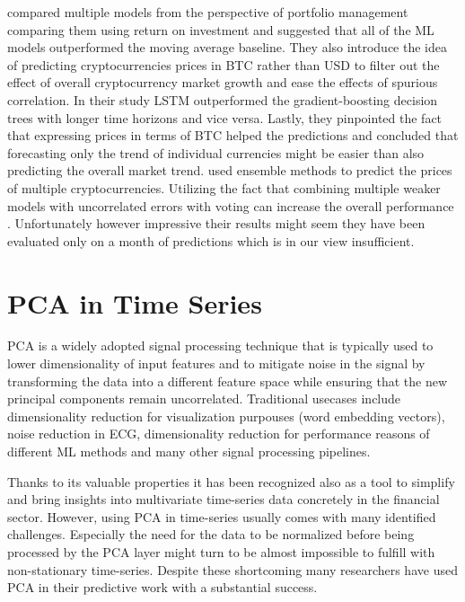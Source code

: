 \cite{Alessandretti2018} compared multiple models from the perspective
of portfolio management comparing them using return on investment and
suggested that all of the \ac{ML} models outperformed the moving average baseline.
They also introduce the idea of predicting cryptocurrencies prices in \ac{BTC} 
rather than USD
to filter out the effect of overall cryptocurrency market growth and ease 
the effects of spurious correlation. In their study \ac{LSTM} outperformed 
the gradient-boosting decision trees with longer time horizons and vice versa.
Lastly, they pinpointed the fact that expressing prices in terms of \ac{BTC}
helped the predictions and concluded that forecasting only the trend of individual 
currencies might be easier than also predicting the overall market trend.
\cite{Chowdhury2020} used ensemble methods to predict the prices of multiple 
cryptocurrencies. Utilizing the fact that combining multiple weaker models
with uncorrelated errors with voting can increase the overall 
performance \cite[see Chapter 14.2]{bishop2006pattern}. 
Unfortunately however impressive their results might seem
they have been evaluated only on a month of predictions which is in our view insufficient.





\section{PCA in Time Series}
\label{sec:pca}

\ac{PCA} is a widely adopted signal processing technique that is typically
used to lower dimensionality of input features and to mitigate noise in the
signal by transforming the data into a different feature space while ensuring
that the new principal components remain uncorrelated. 
Traditional usecases include dimensionality reduction for visualization purpouses 
(word embedding vectors), noise reduction in ECG, dimensionality reduction for performance reasons
of different \ac{ML} methods and many other signal processing pipelines.


Thanks to its valuable properties it has been recognized also as a tool 
to simplify and bring insights into multivariate time-series data 
concretely in the financial sector. However, using \ac{PCA} in time-series
usually comes with many identified challenges. 
Especially the need for the data to be normalized before being processed by 
the \ac{PCA} layer might turn to be almost impossible to fulfill with
non-stationary time-series. Despite these shortcoming many researchers have 
used \ac{PCA} in their predictive work with a substantial success.



